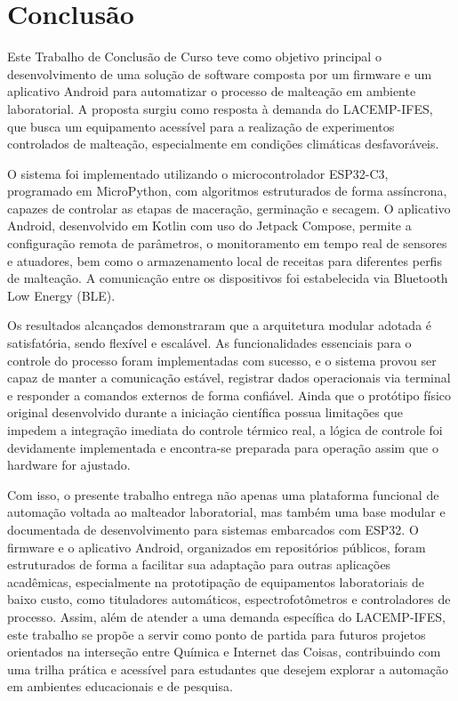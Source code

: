 \chapter[Conclusão]{Conclusão}

Este Trabalho de Conclusão de Curso teve como objetivo principal o desenvolvimento de uma solução de software composta por um firmware e um aplicativo Android para automatizar o processo de malteação em ambiente laboratorial. A proposta surgiu como resposta à demanda do LACEMP-IFES, que busca um equipamento acessível para a realização de experimentos controlados de malteação, especialmente em condições climáticas desfavoráveis.

O sistema foi implementado utilizando o microcontrolador ESP32-C3, programado em MicroPython, com algoritmos estruturados de forma assíncrona, capazes de controlar as etapas de maceração, germinação e secagem. O aplicativo Android, desenvolvido em Kotlin com uso do Jetpack Compose, permite a configuração remota de parâmetros, o monitoramento em tempo real de sensores e atuadores, bem como o armazenamento local de receitas para diferentes perfis de malteação. A comunicação entre os dispositivos foi estabelecida via Bluetooth Low Energy (BLE).

Os resultados alcançados demonstraram que a arquitetura modular adotada é satisfatória, sendo flexível e escalável. As funcionalidades essenciais para o controle do processo foram implementadas com sucesso, e o sistema provou ser capaz de manter a comunicação estável, registrar dados operacionais via terminal e responder a comandos externos de forma confiável. Ainda que o protótipo físico original desenvolvido durante a iniciação científica possua limitações que impedem a integração imediata do controle térmico real, a lógica de controle foi devidamente implementada e encontra-se preparada para operação assim que o hardware for ajustado.

Com isso, o presente trabalho entrega não apenas uma plataforma funcional de automação voltada ao malteador laboratorial, mas também uma base modular e documentada de desenvolvimento para sistemas embarcados com ESP32. O firmware e o aplicativo Android, organizados em repositórios públicos, foram estruturados de forma a facilitar sua adaptação para outras aplicações acadêmicas, especialmente na prototipação de equipamentos laboratoriais de baixo custo, como tituladores automáticos, espectrofotômetros e controladores de processo. Assim, além de atender a uma demanda específica do LACEMP-IFES, este trabalho se propõe a servir como ponto de partida para futuros projetos orientados na interseção entre Química e Internet das Coisas, contribuindo com uma trilha prática e acessível para estudantes que desejem explorar a automação em ambientes educacionais e de pesquisa.

